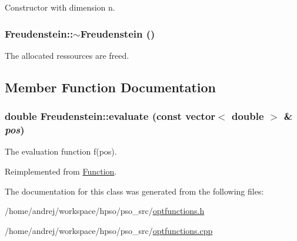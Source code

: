 Constructor with dimension n. 

\hypertarget{classFreudenstein_21fb742403e74470c12fa000e90ddc98}{
\subsubsection{\setlength{\rightskip}{0pt plus 5cm}Freudenstein::$\sim$Freudenstein ()}}
\label{classFreudenstein_21fb742403e74470c12fa000e90ddc98}


The allocated ressources are freed. 



\subsection{Member Function Documentation}
\hypertarget{classFreudenstein_0ab476b270de17051b8d8c1174c1990d}{
\subsubsection{\setlength{\rightskip}{0pt plus 5cm}double Freudenstein::evaluate (const vector$<$ double $>$ \& {\em pos})}}
\label{classFreudenstein_0ab476b270de17051b8d8c1174c1990d}


The evaluation function f(pos). 



Reimplemented from \hyperlink{classFunction_159260a1fc3afa8932491e4057b6b844}{Function}.

The documentation for this class was generated from the following files:\begin{CompactItemize}
\item 
/home/andrej/workspace/hpso/pso\_\-src/\hyperlink{optfunctions_8h}{optfunctions.h}\item 
/home/andrej/workspace/hpso/pso\_\-src/\hyperlink{optfunctions_8cpp}{optfunctions.cpp}\end{CompactItemize}
